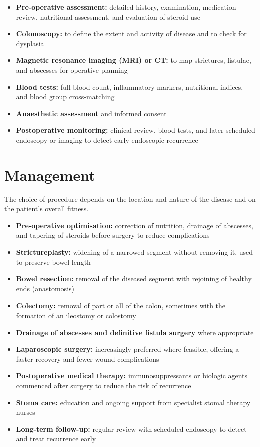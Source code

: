 \begin{itemize}
    \item \textbf{Pre-operative assessment:} detailed history, examination, medication review, nutritional assessment, and evaluation of steroid use
    \item \textbf{Colonoscopy:} to define the extent and activity of disease and to check for dysplasia
    \item \textbf{Magnetic resonance imaging (MRI) or CT:} to map strictures, fistulae, and abscesses for operative planning
    \item \textbf{Blood tests:} full blood count, inflammatory markers, nutritional indices, and blood group cross-matching
    \item \textbf{Anaesthetic assessment} and informed consent
    \item \textbf{Postoperative monitoring:} clinical review, blood tests, and later scheduled endoscopy or imaging to detect early endoscopic recurrence
\end{itemize}

\section*{Management}
The choice of procedure depends on the location and nature of the disease and on the patient's overall fitness.

\begin{itemize}
    \item \textbf{Pre-operative optimisation:} correction of nutrition, drainage of abscesses, and tapering of steroids before surgery to reduce complications
    \item \textbf{Strictureplasty:} widening of a narrowed segment without removing it, used to preserve bowel length
    \item \textbf{Bowel resection:} removal of the diseased segment with rejoining of healthy ends (anastomosis)
    \item \textbf{Colectomy:} removal of part or all of the colon, sometimes with the formation of an ileostomy or colostomy
    \item \textbf{Drainage of abscesses and definitive fistula surgery} where appropriate
    \item \textbf{Laparoscopic surgery:} increasingly preferred where feasible, offering a faster recovery and fewer wound complications
    \item \textbf{Postoperative medical therapy:} immunosuppressants or biologic agents commenced after surgery to reduce the risk of recurrence
    \item \textbf{Stoma care:} education and ongoing support from specialist stomal therapy nurses
    \item \textbf{Long-term follow-up:} regular review with scheduled endoscopy to detect and treat recurrence early
\end{itemize}


